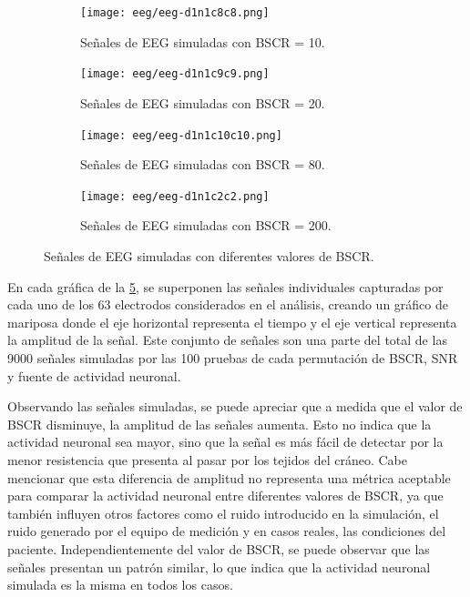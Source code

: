 \begin{figure}[p]
    \centering
    \begin{subfigure}{\textwidth}
        \texttt{[image: eeg/eeg-d1n1c8c8.png]}
        \caption{Señales de EEG simuladas con BSCR = 10.}
        \label{fig:eeg-d1n1c8c8}
        \vspace{0.5em}
    \end{subfigure}
    \vfill
    \begin{subfigure}{\textwidth}
        \texttt{[image: eeg/eeg-d1n1c9c9.png]}
        \caption{Señales de EEG simuladas con BSCR = 20.}
        \label{fig:eeg-d1n1c9c9}
        \vspace{0.5em}
    \end{subfigure}
    \vfill
    \begin{subfigure}{\textwidth}
        \texttt{[image: eeg/eeg-d1n1c10c10.png]}
        \caption{Señales de EEG simuladas con BSCR = 80.}
        \label{fig:eeg-d1n1c10c10}
        \vspace{0.5em}
    \end{subfigure}
    \vfill
    \begin{subfigure}{\textwidth}
        \texttt{[image: eeg/eeg-d1n1c2c2.png]}
        \caption{Señales de EEG simuladas con BSCR = 200.}
        \label{fig:eeg-d1n1c2c2}
    \end{subfigure}
    \caption{Señales de EEG simuladas con diferentes valores de BSCR.}
    \label{fig:eeg-simulated}
\end{figure}

En cada gráfica de la \cref{fig:eeg-simulated}, se superponen las señales individuales capturadas por cada uno de los 63 electrodos considerados en el análisis, creando un gráfico de mariposa donde el eje horizontal representa el tiempo y el eje vertical representa la amplitud de la señal.
Este conjunto de señales son una parte del total de las 9000 señales simuladas por las 100 pruebas de cada permutación de BSCR, SNR y fuente de actividad neuronal.

Observando las señales simuladas, se puede apreciar que a medida que el valor de BSCR disminuye, la amplitud de las señales aumenta.
Esto no indica que la actividad neuronal sea mayor, sino que la señal es más fácil de detectar por la menor resistencia que presenta al pasar por los tejidos del cráneo.
Cabe mencionar que esta diferencia de amplitud no representa una métrica aceptable para comparar la actividad neuronal entre diferentes valores de BSCR, ya que también influyen otros factores como el ruido introducido en la simulación, el ruido generado por el equipo de medición y en casos reales, las condiciones del paciente.
Independientemente del valor de BSCR, se puede observar que las señales presentan un patrón similar, lo que indica que la actividad neuronal simulada es la misma en todos los casos.

